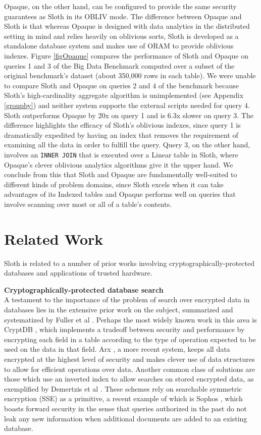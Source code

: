 \documentclass[USenglish,oneside,twocolumn]{article}
\def\name/{Sloth}
\begin{document}
Opaque, on the other hand, can be configured to provide the same security guarantees as \name/ in its OBLIV mode. The difference between Opaque and \name/ is that whereas Opaque is designed with data analytics in the distributed setting in mind and relies heavily on oblivious sorts, \name/ is developed as a standalone database system and makes use of ORAM to provide oblivious indexes. Figure \ref{figOpaque} compares the performance of \name/ and Opaque on queries 1 and 3 of the Big Data Benchmark \cite{BDB} computed over a subset of the original benchmark's dataset (about 350,000 rows in each table). We were unable to compare \name/ and  Opaque on queries 2 and 4 of the benchmark because \name/'s high-cardinality aggregate algorithm is unimplemented (see Appendix \ref{groupby}) and neither system supports the external scripts needed for query 4. \name/ outperforms Opaque by 20x on query 1 and is 6.3x slower on query 3. The difference highlights the efficacy of \name/'s oblivious indexes, since query 1 is dramatically expedited by having an index that removes the requirement of examining all the data in order to fulfill the query. Query 3, on the other hand, involves an \texttt{INNER JOIN} that is executed over a Linear table in \name/, where Opaque's clever oblivious analytics algorithms give it the upper hand. We conclude from this that \name/ and Opaque are fundamentally well-suited to different kinds of problem domains, since \name/ excels when it can take advantages of its Indexed tables and Opaque performs well on queries that involve scanning over most or all of a table's contents. 


\section{Related Work}\label{related}

\name/ is related to a number of prior works involving cryptographically-protected databases and applications of trusted hardware.

\medskip \noindent \textbf{Cryptographically-protected database search}\\
A testament to the importance of the problem of search over encrypted data in databases lies in the extensive prior work on the subject, summarized and systematized by Fuller et al \cite{FVY+17}. Perhaps the most widely known work in this area is CryptDB \cite{PRZB12}, which implements a tradeoff between security and performance by encrypting each field in a table according to the type of operation expected to be used on the data in that field. Arx \cite{PBP16}, a more recent system, keeps all data encrypted at the highest level of security and makes clever use of data structures to allow for efficient operations over data. Another common class of solutions are those which use an inverted index to allow searches on stored encrypted data, as exemplified by Demertzis et al \cite{DPP+16}. These schemes rely on searchable symmetric encryption (SSE) as a primitive, a recent example of which is Sophos \cite{Bost16}, which boasts forward security in the sense that queries authorized in the past do not leak any new information when additional documents are added to an existing database. 
\end{document}
